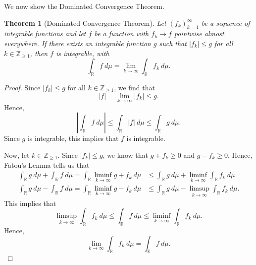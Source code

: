\documentclass[a4paper, openany]{memoir}
\theoremstyle{definition}
\theoremstyle{plain}
\newtheorem{theorem}[definition]{Theorem}
\begin{document}
    We now show the Dominated Convergence Theorem.
    \begin{theorem}[Dominated Convergence Theorem]
        Let $(f_k)_{k=1}^\infty$ be a sequence of integrable functions and let $f$ be a function with $f_k \to f$ pointwise almost everywhere. If there exists an integrable function $g$ such that $|f_k| \leq g$ for all $k \in \mathbb{Z}_{\geq 1}$, then $f$ is integrable, with
        \[\int_{\mathbb{R}} f \ d\mu = \lim_{k \to \infty} \int_{\mathbb{R}} f_k \ d\mu.\]
    \end{theorem}
    \begin{proof}
        Since $|f_k| \leq g$ for all $k \in \mathbb{Z}_{\geq 1}$, we find that
        \[|f| = \lim_{k \to \infty} |f_k| \leq g.\]
        Hence,
        \[\left|\int_{\mathbb{R}} f \ d\mu\right| \leq \int_{\mathbb{R}} |f| \ d\mu \leq \int_{\mathbb{R}} g \ d\mu.\]
        Since $g$ is integrable, this implies that $f$ is integrable.

        Now, let $k \in \mathbb{Z}_{\geq 1}$. Since $|f_k| \leq g$, we know that $g + f_k \geq 0$ and $g - f_k \geq 0$. Hence, Fatou's Lemma tells us that
        \begin{align*}
            \int_{\mathbb{R}} g \ d\mu + \int_{\mathbb{R}} f \ d\mu = \int_{\mathbb{R}} \liminf_{k \to \infty} g + f_k \ d\mu &\leq \int_{\mathbb{R}} g \ d\mu + \liminf_{k \to \infty} \int_{\mathbb{R}} f_k \ d\mu \\
            \int_{\mathbb{R}} g \ d\mu - \int_{\mathbb{R}} f \ d\mu = \int_{\mathbb{R}} \liminf_{k \to \infty} g - f_k \ d\mu &\leq \int_{\mathbb{R}} g \ d\mu - \limsup_{k \to \infty} \int_{\mathbb{R}} f_k \ d\mu.
        \end{align*}
        This implies that
        \[\limsup_{k \to \infty} \int_{\mathbb{R}} f_k \ d\mu \leq \int_{\mathbb{R}} f \ d\mu \leq \liminf_{k \to \infty} \int_{\mathbb{R}} f_k \ d\mu.\]
        Hence,
        \[\lim_{k \to \infty} \int_{\mathbb{R}} f_k \ d\mu = \int_{\mathbb{R}} f \ d\mu.\]
    \end{proof}
    
\end{document}
